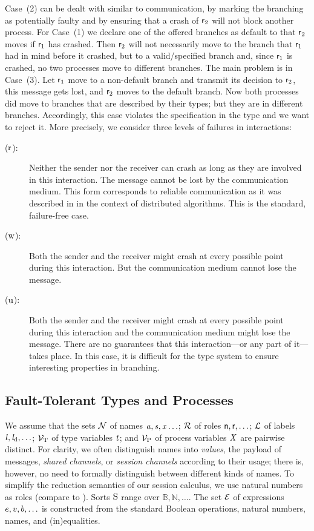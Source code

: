 Case~(2) can be dealt with similar to \unrel communication, \ie by marking the branching as potentially faulty and by ensuring that a crash of $ \Role_2 $ will not block another process.
For Case~(1) we declare one of the offered branches as default to that $ \Role_2 $ moves if $ \Role_1 $ has crashed.
Then $ \Role_2 $ will not necessarily move to the branch that $ \Role_1 $ had in mind before it crashed, but to a valid/specified branch and, since $ \Role_1 $ is crashed, no two processes move to different branches.
The main problem is in Case~(3).
Let $ \Role_1 $ move to a non-default branch and transmit its decision to $ \Role_2 $, this message gets lost, and $ \Role_2 $ moves to the default branch.
Now both processes did move to branches that are described by their types; but they are in different branches.
Accordingly, this case violates the specification in the type and we want to reject it.
More precisely, we consider three levels of failures in interactions:
\begin{description}
	\item[\StrongR ($ \iR $):] Neither the sender nor the receiver can crash as long as they are involved in this interaction. The message cannot be lost by the communication medium. This form corresponds to reliable communication as it was described in \cite{AguileraChenToueg97} in the context of distributed algorithms.
		This is the standard, failure-free case.
	\item[\WeakR ($ \iW $):] Both the sender and the receiver might crash at every possible point during this interaction. But the communication medium cannot lose the message.
	\item[\Unrel ($ \iU $):] Both the sender and the receiver might crash at every possible point during this interaction and the communication medium might lose the message. There are no guarantees that this interaction---or any part of it---takes place.
		In this case, it is difficult for the type system to ensure interesting properties in branching.
\end{description}

\subsection{Fault-Tolerant Types and Processes}
\label{sec:syntax}

We assume that the sets $ \names $ of names $ \Chan[a], \Chan, \Args \ldots $; $ \roles $ of roles $ \Role[n], \Role, \ldots $; $ \labels $ of labels $ \Label, \LabelD, \ldots $; $ \typeVars $ of type variables $ \TypeV $; and $ \procVars $ of process variables $ \ProcV $ are pairwise distinct.
For clarity, we often distinguish names into \emph{values}, \ie the payload of messages, \emph{shared channels}, or \emph{session channels} according to their usage; there is, however, no need to formally distinguish between different kinds of names.
To simplify the reduction semantics of our session calculus, we use natural numbers as roles (compare to \cite{hondaYoshidaCarbone16}).
Sorts $ \Sort $ range over $ \mathbb{B}, \mathbb{N}, \ldots $.
The set $ \expressions $ of expressions $ \Expr, \Expr[v], \Expr[b], \ldots $ is constructed from the standard Boolean operations, natural numbers, names, and (in)equalities.

